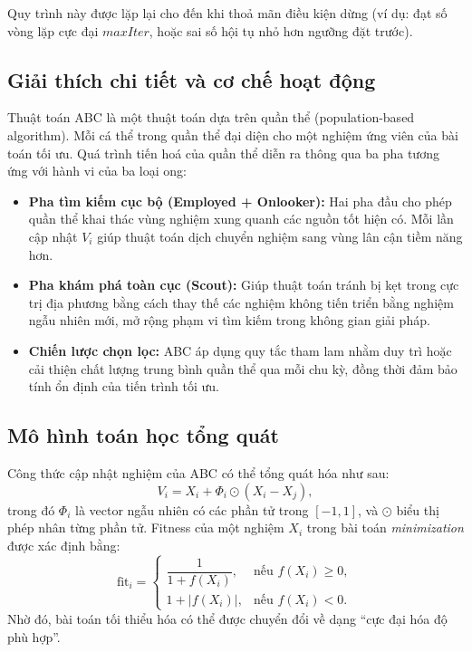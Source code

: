 \documentclass[a4paper]{report}
\begin{document}
Quy trình này được lặp lại cho đến khi thoả mãn điều kiện dừng (ví dụ: đạt số vòng lặp cực đại $maxIter$, hoặc sai số hội tụ nhỏ hơn ngưỡng đặt trước).

\subsection{Giải thích chi tiết và cơ chế hoạt động}
Thuật toán ABC là một thuật toán dựa trên quần thể (population-based algorithm). Mỗi cá thể trong quần thể đại diện cho một nghiệm ứng viên của bài toán tối ưu. Quá trình tiến hoá của quần thể diễn ra thông qua ba pha tương ứng với hành vi của ba loại ong:

\begin{itemize}
    \item \textbf{Pha tìm kiếm cục bộ (Employed + Onlooker):}  
    Hai pha đầu cho phép quần thể khai thác vùng nghiệm xung quanh các nguồn tốt hiện có. Mỗi lần cập nhật $V_i$ giúp thuật toán dịch chuyển nghiệm sang vùng lân cận tiềm năng hơn.
    
    \item \textbf{Pha khám phá toàn cục (Scout):}  
    Giúp thuật toán tránh bị kẹt trong cực trị địa phương bằng cách thay thế các nghiệm không tiến triển bằng nghiệm ngẫu nhiên mới, mở rộng phạm vi tìm kiếm trong không gian giải pháp.

    \item \textbf{Chiến lược chọn lọc:}  
    ABC áp dụng quy tắc tham lam nhằm duy trì hoặc cải thiện chất lượng trung bình quần thể qua mỗi chu kỳ, đồng thời đảm bảo tính ổn định của tiến trình tối ưu.
\end{itemize}

\subsection{Mô hình toán học tổng quát}
Công thức cập nhật nghiệm của ABC có thể tổng quát hóa như sau:
\[
V_i = X_i + \Phi_i \odot (X_i - X_j),
\]
trong đó $\Phi_i$ là vector ngẫu nhiên có các phần tử trong $[-1,1]$, và $\odot$ biểu thị phép nhân từng phần tử.  
Fitness của một nghiệm $X_i$ trong bài toán \textit{minimization} được xác định bằng:
\[
\mathrm{fit}_i = 
\begin{cases}
\dfrac{1}{1 + f(X_i)}, & \text{nếu } f(X_i) \ge 0,\\[1em]
1 + |f(X_i)|, & \text{nếu } f(X_i) < 0.
\end{cases}
\]
Nhờ đó, bài toán tối thiểu hóa có thể được chuyển đổi về dạng “cực đại hóa độ phù hợp”.
\end{document}
